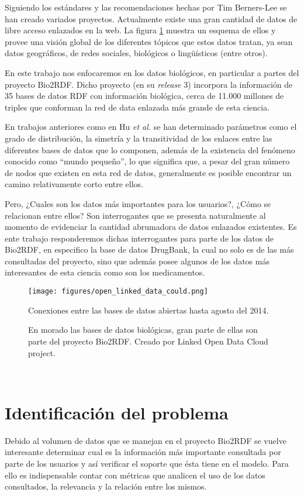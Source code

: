 Siguiendo los estándares y las recomendaciones hechas por Tim Berners-Lee se han
creado variados proyectos.
Actualmente existe una gran cantidad de datos de libre acceso enlazados en la
web. La figura \ref{fig:cloud} muestra un esquema de ellos y provee una visión
global de los diferentes tópicos que estos datos tratan, ya sean datos
geográficos, de redes sociales, biológicos o lingüísticos (entre otros).

En este trabajo nos enfocaremos en los datos biológicos, en particular a partes
del proyecto Bio2RDF.
Dicho proyecto (en su \emph{release} 3) incorpora la información de 35 bases de
datos RDF con información biológica, cerca de 11.000 millones de triples que
conforman la red de data enlazada más grande de esta ciencia.

En trabajos anteriores como en Hu \emph{et al.}\cite{hu2015link} se han
determinado parámetros como el grado de distribución, la simetría y la
transitividad de los enlaces entre las diferentes bases de datos que lo
componen, además de la existencia del fenómeno conocido como ``mundo pequeño'',
lo que significa que, a pesar del gran número de nodos que existen en esta red
de datos, generalmente es posible encontrar un camino relativamente corto entre
ellos.

Pero, ¿Cuales son los datos más importantes para los usuarios?, ¿Cómo se
relacionan entre ellos? Son interrogantes que se presenta naturalmente al
momento de evidenciar la cantidad abrumadora de datos enlazados existentes.
Es ente trabajo responderemos dichas interrogantes para parte de los datos de
Bio2RDF, en especifico la base de datos DrugBank, la cual no solo es de las más
consultadas del proyecto, sino que además posee algunos de los datos más
interesantes de esta ciencia como son los medicamentos.

\begin{figure}[ht]
  \centering
  \texttt{[image: figures/open\_linked\_data\_could.png]}
  \caption{Conexiones entre las bases de datos abiertas hasta agosto del 2014.}
  \vspace{-.2cm}
  \caption*{En morado las bases de datos biológicas, gran parte de ellas son
  parte del proyecto Bio2RDF. Creado por Linked Open Data Cloud project\cite{lod:cloud}.}
  \label{fig:cloud}
\end{figure}
~\vspace{-1cm}

\section{Identificación del problema}
Debido al volumen de datos que se manejan en el proyecto Bio2RDF se vuelve
interesante determinar cual es la información más importante consultada por
parte de los usuarios y así verificar el soporte que ésta tiene en el modelo. 
Para ello es indispensable contar con métricas que analicen el uso de los datos
consultados, la relevancia y la relación entre los mismos.

